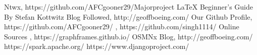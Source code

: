 
\begin{thebibliography}{9}
\bibitem{} Ntwx, https://github.com/AFCgooner29/Majorproject
\bibitem{} \LaTeX{} Beginner's Guide By Stefan Kottwitz 
\bibitem{} Blog Followed, http://geoffboeing.com/
\bibitem{} Our Github Profile, https://github.com/AFCgooner29/ , https://github.com/singh1114/
\bibitem{} Online Sources , https://graphframes.github.io/
\bibitem{} OSMNx Blog, http://geoffboeing.com/
\bibitem{} https://spark.apache.org/
\bibitem{} https://www.djangoproject.com/


\end{thebibliography}


